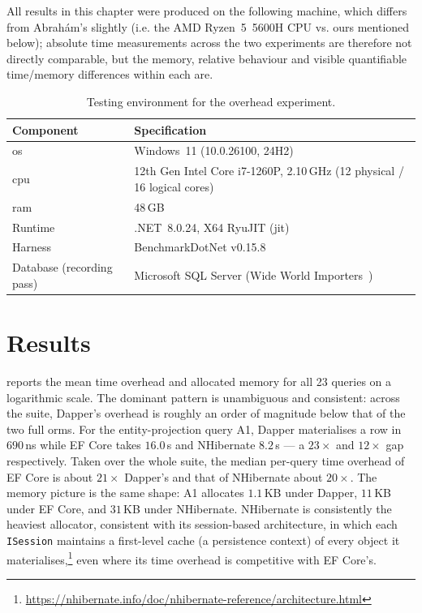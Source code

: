 All results in this chapter were produced on the following machine, which differs from Abrahám's slightly (i.e. the AMD Ryzen~5~5600H CPU vs. ours mentioned below); absolute time measurements across the two experiments are therefore not directly comparable, but the memory, relative behaviour and visible quantifiable time/memory differences within each are.

\begin{table}[H]
\centering
\caption{Testing environment for the overhead experiment.}
\label{tab:overhead-env}
\begin{tabularx}{\columnwidth}{@{}lX@{}}
\toprule
Component & Specification \\
\midrule
\acrshort{os} & Windows~11 (10.0.26100, 24H2) \\
\acrshort{cpu} & 12th Gen Intel Core i7-1260P, 2.10\,GHz (12 physical / 16 logical cores) \\
\acrshort{ram} & 48\,GB \\
Runtime & .NET~8.0.24, X64 RyuJIT (\acrshort{jit}) \\
Harness & BenchmarkDotNet v0.15.8 \\
Database (recording pass) & Microsoft SQL Server (Wide World Importers~\cite{wideWorldImporters}) \\
\bottomrule
\end{tabularx}
\end{table}

\section{Results}
\label{sec:overhead-results}

 reports the mean time overhead and allocated memory for all 23 queries on a logarithmic scale. The dominant pattern is unambiguous and consistent: across the suite, Dapper's overhead is roughly an order of magnitude below that of the two full \acrshort{orm}s. For the entity-projection query A1, Dapper materialises a row in $690$\,ns while EF Core takes $16.0$\,\textmu s and NHibernate $8.2$\,\textmu s --- a $23\times$ and $12\times$ gap respectively. Taken over the whole suite, the median per-query time overhead of EF Core is about $21\times$ Dapper's and that of NHibernate about $20\times$. The memory picture is the same shape: A1 allocates $1.1$\,KB under Dapper, $11$\,KB under EF Core, and $31$\,KB under NHibernate. NHibernate is consistently the heaviest allocator, consistent with its session-based architecture, in which each \texttt{ISession} maintains a first-level cache (a persistence context) of every object it materialises,\footnote{\url{https://nhibernate.info/doc/nhibernate-reference/architecture.html}} even where its time overhead is competitive with EF Core's.

